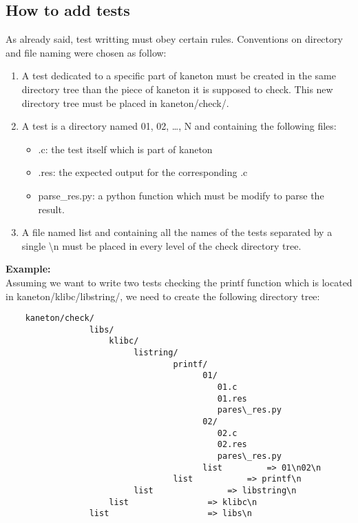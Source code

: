 \subsection{How to add tests}
As already said, test writting must obey certain rules. Conventions on
directory and file naming were chosen as follow:
\begin{enumerate}
\item A test dedicated to a specific part of kaneton must be created in the same
directory tree than the piece of kaneton it is supposed to check. This new
directory tree must be placed in kaneton/check/.
\item A test is a directory named 01, 02, \ldots, N and containing the following
files:
\begin{itemize}
\item .c: the test itself which is part of kaneton
\item .res: the expected output for the corresponding .c
\item parse\_res.py: a python function which must be modify to parse the
result.
\end{itemize}
\item A file named list and containing all the names of the tests separated by a
single \textbackslash n must be placed in every level of the check directory
tree.
\\
\end{enumerate}
{\bf Example:}\\
Assuming we want to write two tests checking the printf function
which is located in kaneton/klibc/libstring/, we need to create the following
 directory tree:

\begin{verbatim}
    kaneton/check/
                 libs/
                     klibc/
                          listring/
                                  printf/
                                        01/
                                           01.c
                                           01.res
                                           pares\_res.py
                                        02/
                                           02.c
                                           02.res
                                           pares\_res.py
                                        list		 => 01\n02\n
                                  list			 => printf\n
                          list				 => libstring\n
                     list				 => klibc\n
                 list					 => libs\n

\end{verbatim}


